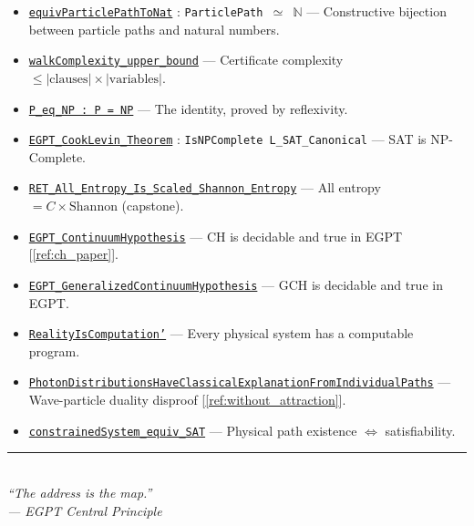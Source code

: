 \documentclass[11pt,a4paper]{article}
\begin{document}
\begin{itemize}
    \item \href{https://eabadir.github.io/EGPT/Lean/EGPT/NumberTheory/Core.lean}{\texttt{equivParticlePathToNat}} : \texttt{ParticlePath $\simeq$ $\mathbb{N}$} --- Constructive bijection between particle paths and natural numbers.
    \item \href{https://eabadir.github.io/EGPT/Lean/EGPT/Complexity/TableauFromCNF.lean}{\texttt{walkComplexity\_upper\_bound}} --- Certificate complexity $\leq |\text{clauses}| \times |\text{variables}|$.
    \item \href{https://eabadir.github.io/EGPT/Lean/EGPT/Complexity/PPNP.lean}{\texttt{P\_eq\_NP : P = NP}} --- The identity, proved by reflexivity.
    \item \href{https://eabadir.github.io/EGPT/Lean/EGPT/Complexity/PPNP.lean}{\texttt{EGPT\_CookLevin\_Theorem}} : \texttt{IsNPComplete L\_SAT\_Canonical} --- SAT is NP-Complete.
    \item \href{https://eabadir.github.io/EGPT/Lean/EGPT/NumberTheory/Analysis.lean}{\texttt{RET\_All\_Entropy\_Is\_Scaled\_Shannon\_Entropy}} --- All entropy $= C \times \text{Shannon}$ (capstone).
    \item \href{https://eabadir.github.io/EGPT/Lean/EGPT/NumberTheory/ContinuumHypothesis.lean}{\texttt{EGPT\_ContinuumHypothesis}} --- CH is decidable and true in EGPT [\ref{ref:ch_paper}].
    \item \href{https://eabadir.github.io/EGPT/Lean/EGPT/NumberTheory/ContinuumHypothesis.lean}{\texttt{EGPT\_GeneralizedContinuumHypothesis}} --- GCH is decidable and true in EGPT.
    \item \href{https://eabadir.github.io/EGPT/Lean/EGPT/Physics/RealityIsComputation.lean}{\texttt{RealityIsComputation'}} --- Every physical system has a computable program.
    \item \href{https://eabadir.github.io/EGPT/Lean/PPNP/Proofs/WaveParticleDualityDisproved.lean}{\texttt{PhotonDistributionsHaveClassicalExplanationFromIndividualPaths}} --- Wave-particle duality disproof [\ref{ref:without_attraction}].
    \item \href{https://eabadir.github.io/EGPT/Lean/EGPT/Complexity/Physics.lean}{\texttt{constrainedSystem\_equiv\_SAT}} --- Physical path existence $\Leftrightarrow$ satisfiability.
\end{itemize}

\vspace{2em}
\begin{center}
\rule{0.5\textwidth}{0.4pt}\\[0.5em]
\small\itshape
``The address is the map.''\\
--- EGPT Central Principle
\end{center}
\end{document}
